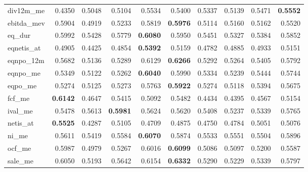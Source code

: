 \begin{longtable}{>{\raggedright\arraybackslash}p{2.6cm}rrrrrrrrr}
div12m\_me & 0.4350 & \cellcolor{blue!10}0.5048 & \cellcolor{blue!10}0.5104 & \cellcolor{blue!10}0.5534 & \cellcolor{blue!10}0.5400 & \cellcolor{blue!10}0.5337 & \cellcolor{blue!10}0.5139 & \cellcolor{blue!10}0.5471 & \textbf{\cellcolor{blue!10}0.5552} \\
ebitda\_mev & 0.5904 & 0.4919 & 0.5233 & 0.5819 & \textbf{\cellcolor{blue!10}0.5976} & 0.5114 & 0.5160 & 0.5162 & 0.5520 \\
eq\_dur & 0.5992 & 0.5428 & 0.5779 & \textbf{\cellcolor{blue!10}0.6080} & 0.5950 & 0.5451 & 0.5327 & 0.5384 & 0.5852 \\
eqnetis\_at & 0.4905 & 0.4425 & 0.4854 & \textbf{\cellcolor{blue!10}0.5392} & \cellcolor{blue!10}0.5159 & 0.4782 & 0.4885 & \cellcolor{blue!10}0.4933 & \cellcolor{blue!10}0.5151 \\
eqnpo\_12m & 0.5682 & 0.5136 & 0.5289 & \cellcolor{blue!10}0.6129 & \textbf{\cellcolor{blue!10}0.6266} & 0.5292 & 0.5264 & 0.5405 & \cellcolor{blue!10}0.5792 \\
eqnpo\_me & 0.5349 & 0.5122 & 0.5262 & \textbf{\cellcolor{blue!10}0.6040} & \cellcolor{blue!10}0.5990 & 0.5334 & 0.5239 & \cellcolor{blue!10}0.5444 & \cellcolor{blue!10}0.5744 \\
eqpo\_me & 0.5274 & 0.5125 & 0.5273 & \cellcolor{blue!10}0.5763 & \textbf{\cellcolor{blue!10}0.5922} & \cellcolor{blue!10}0.5274 & 0.5118 & \cellcolor{blue!10}0.5394 & \cellcolor{blue!10}0.5675 \\
fcf\_me & \textbf{0.6142} & 0.4647 & 0.5415 & 0.5092 & 0.5482 & 0.4434 & 0.4395 & 0.4567 & 0.5154 \\
ival\_me & 0.5478 & \cellcolor{blue!10}0.5613 & \textbf{\cellcolor{blue!10}0.5981} & \cellcolor{blue!10}0.5624 & \cellcolor{blue!10}0.5620 & 0.5408 & 0.5237 & 0.5339 & \cellcolor{blue!10}0.5765 \\
netis\_at & \textbf{0.5525} & 0.4287 & 0.5105 & 0.4709 & 0.4875 & 0.4750 & 0.4784 & 0.5051 & 0.5076 \\
ni\_me & 0.5611 & 0.5419 & 0.5584 & \textbf{\cellcolor{blue!10}0.6070} & \cellcolor{blue!10}0.5874 & 0.5533 & 0.5551 & 0.5504 & \cellcolor{blue!10}0.5896 \\
ocf\_me & 0.5987 & 0.4979 & 0.5267 & \cellcolor{blue!10}0.6016 & \textbf{\cellcolor{blue!10}0.6099} & 0.5086 & 0.5097 & 0.5200 & 0.5587 \\
sale\_me & 0.6050 & 0.5193 & 0.5642 & \cellcolor{blue!10}0.6154 & \textbf{\cellcolor{blue!10}0.6332} & 0.5290 & 0.5229 & 0.5339 & 0.5797 \\
\hline
\end{longtable}
\endgroup
